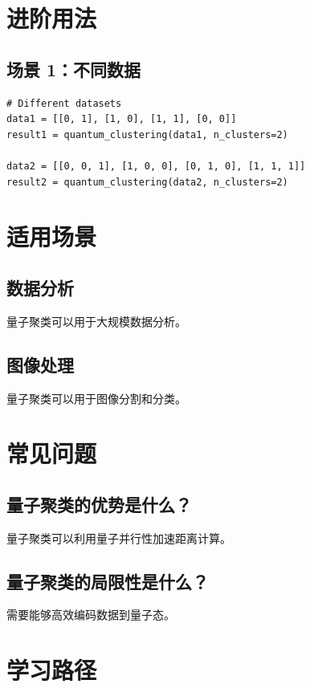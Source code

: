 \documentclass[12pt,a4paper]{article}
\begin{document}
\section{进阶用法}

\subsection{场景 1：不同数据}

\begin{lstlisting}[style=python]
# Different datasets
data1 = [[0, 1], [1, 0], [1, 1], [0, 0]]
result1 = quantum_clustering(data1, n_clusters=2)

data2 = [[0, 0, 1], [1, 0, 0], [0, 1, 0], [1, 1, 1]]
result2 = quantum_clustering(data2, n_clusters=2)
\end{lstlisting}

\section{适用场景}

\subsection{数据分析}

量子聚类可以用于大规模数据分析。

\subsection{图像处理}

量子聚类可以用于图像分割和分类。

\section{常见问题}

\subsection{量子聚类的优势是什么？}

量子聚类可以利用量子并行性加速距离计算。

\subsection{量子聚类的局限性是什么？}

需要能够高效编码数据到量子态。

\section{学习路径}
\end{document}
